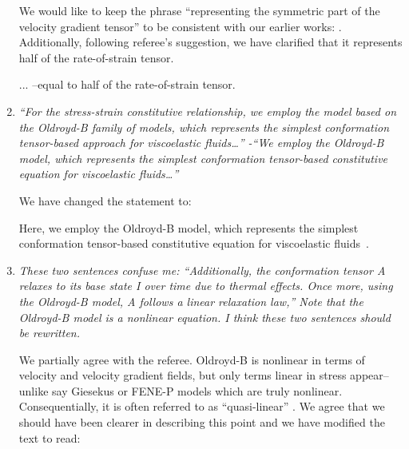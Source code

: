 \documentclass[]{article}
\newcommand{\oo}{\color{magenta} \normalfont}
\newcommand{\bb}{\color{black} \normalfont}
\begin{document}
\begin{enumerate}
We would like to keep the phrase ``representing the symmetric part of the velocity gradient tensor'' to be consistent with our earlier works: \citet{sanjay2021bursting,ari2024bursting}. Additionally, following referee's suggestion, we have clarified that it represents half of the rate-of-strain tensor.

...\oo--equal to half of the rate-of-strain tensor.\bb

\item \textit{``For the stress-strain constitutive relationship, we employ the model based on the
Oldroyd-B family of models, which represents the simplest conformation tensor-based approach for viscoelastic fluids…” -``We employ the Oldroyd-B model, which represents the simplest conformation tensor-based constitutive equation for viscoelastic fluids…”}

We have changed the statement to:

\oo Here, we employ the Oldroyd-B model, which represents the simplest conformation tensor-based constitutive equation for viscoelastic fluids \bb\,\citep{oldroyd1950formulation, bird1977dynamics, snoeijer2020relationship, stone2023note, boyko2024perspective}.


\item \textit{These two sentences confuse me: ``Additionally, the conformation tensor A relaxes to
its base state I over time due to thermal effects. Once more, using the Oldroyd-B
model, A follows a linear relaxation law,” Note that the Oldroyd-B model is a nonlinear equation. I think these two sentences should be rewritten.}


We partially agree with the referee. Oldroyd-B is nonlinear in terms of velocity and velocity gradient fields, but only terms linear in stress appear--unlike say Giesekus or FENE-P models which are truly nonlinear.
Consequentially, it is often referred to as ``quasi-linear” \citep{davoodi2018secondary, alves2021numerical}. %
We agree that we should have been clearer in describing this point and we have modified the text to read:



\end{enumerate}
\end{document}
